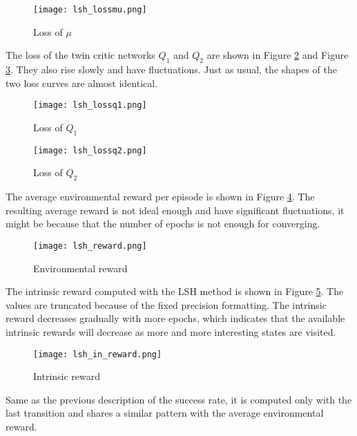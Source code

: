 \documentclass[a4paper, 12pt]{report}
\begin{document}
        \begin{figure}[H]
        \centering
        \texttt{[image: lsh\_lossmu.png]}
        \caption{Loss of $\mu$}
            \label{lsh_lossmu}
        \end{figure}

    The loss of the twin critic networks $Q_1$ and $Q_2$ are shown in Figure \ref{lsh_lossq1} and Figure \ref{lsh_lossq2}. They also rise slowly and have fluctuations. Just as usual, the shapes of the two loss curves are almost identical.

        \begin{figure}[H]
        \centering
        \texttt{[image: lsh\_lossq1.png]}
        \caption{Loss of $Q_1$}
            \label{lsh_lossq1}
        \end{figure}

        \begin{figure}[H]
        \centering
        \texttt{[image: lsh\_lossq2.png]}
        \caption{Loss of $Q_2$}
            \label{lsh_lossq2}
        \end{figure}

    The average environmental reward per episode is shown in Figure \ref{lsh_reward}. The resulting average reward is not ideal enough and have significant fluctuations, it might be because that the number of epochs is not enough for converging.

        \begin{figure}[H]
        \centering
        \texttt{[image: lsh\_reward.png]}
        \caption{Environmental reward}
            \label{lsh_reward}
        \end{figure}

    The intrinsic reward computed with the LSH method is shown in Figure \ref{lsh_in_reward}. The values are truncated because of the fixed precision formatting. The intrinsic reward decreases gradually with more epochs, which indicates that the available intrinsic rewards will decrease as more and more interesting states are visited.

        \begin{figure}[H]
        \centering
        \texttt{[image: lsh\_in\_reward.png]}
        \caption{Intrinsic reward}
            \label{lsh_in_reward}
        \end{figure}

    Same as the previous description of the success rate, it is computed only with the last transition and shares a similar pattern with the average environmental reward.
\end{document}
